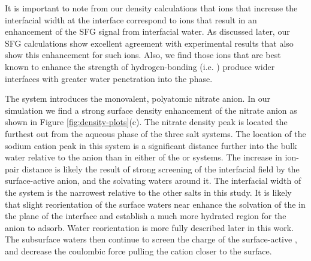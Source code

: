 

It is important to note from our density calculations that ions that increase the interfacial width at the \ctcwat interface correspond to ions that result in an enhancement of the SFG signal from interfacial water. As discussed later, our SFG calculations show excellent agreement with experimental results that also show this enhancement for such ions. Also, we find those ions that are best known to enhance the strength of hydrogen-bonding (i.e. \sul) produce wider interfaces with greater water penetration into the \ctc phase.

The \sodnit system introduces the monovalent, polyatomic nitrate anion. In our simulation we find a strong surface density enhancement of the nitrate anion as shown in Figure \ref{fig:density-plots}(c). The nitrate density peak is located the furthest out from the aqueous phase of the three salt systems. The location of the sodium cation peak in this system is a significant distance further into the bulk water relative to the anion than in either of the \nacl or \sodsul systems. The increase in ion-pair distance is likely the result of strong screening of the interfacial field by the surface-active anion, and the solvating waters around it. The interfacial width of the \sodnit system is the narrowest relative to the other salts in this study. It is likely that slight reorientation of the surface waters near \ctc enhance the solvation of the \nit in the plane of the interface and establish a much more hydrated region for the anion to adsorb. Water reorientation is more fully described later in this work. The subsurface waters then continue to screen the charge of the surface-active \nit, and decrease the coulombic force pulling the cation closer to the surface. 

